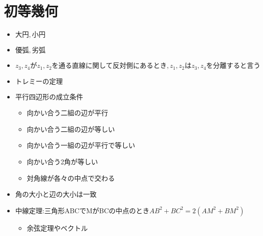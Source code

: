 \documentclass[dvipdfmx,uplatex]{jsarticle}
\begin{document}
\section{初等幾何}
\begin{itemize}
	\item $ 大円,小円$
	\item $ 優弧,劣弧$
	\item $ z_3,z_4がz_1,z_2を通る直線に関して反対側にあるとき,z_1,z_2はz_3,z_4を分離すると言う$
	\item $ トレミーの定理$
	\item 平行四辺形の成立条件
	\begin{itemize}
		\item 向かい合う二組の辺が平行
		\item 向かい合う二組の辺が等しい
		\item 向かい合う一組の辺が平行で等しい
		\item 向かい合う2角が等しい
		\item 対角線が各々の中点で交わる
	\end{itemize}
	\item 角の大小と辺の大小は一致
	\item 中線定理:三角形ABCでMがBCの中点のとき$AB^2+BC^2=2(AM^2+BM^2)$
	\begin{itemize}
		\item 余弦定理やベクトル
	\end{itemize}
\end{itemize}
\end{document}
